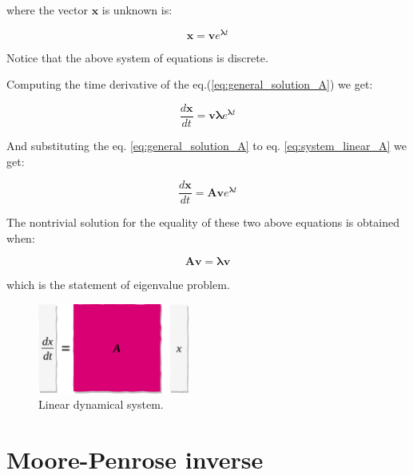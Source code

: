\documentclass[10pt,twocolumn]{article}
\begin{document}
where the vector $\mathbf{x}$ is unknown is:

\begin{equation} \label{eq:general_solution_A}
\mathbf{x} = \mathbf{v} e^{\bm{\lambda} t}
\end{equation}

Notice that the above system of equations is discrete.

Computing the time derivative of the eq.(\ref{eq:general_solution_A}) we get:

\begin{equation} \label{eq:sub1}
\frac{d \mathbf{x}}{dt} = \mathbf{v} \bm{\lambda} e^{\bm{\lambda} t}
\end{equation}

And substituting the eq. \ref{eq:general_solution_A} to eq. \ref{eq:system_linear_A} we get:

\begin{equation} \label{eq:sub2}
\frac{d \mathbf{x}}{dt} = \mathbf{A} \mathbf{v} e^{\bm{\lambda} t}
\end{equation}

The nontrivial solution for the equality of these two above equations is obtained when:

\begin{equation} \label{eq:eigval}
\mathbf{A} \mathbf{v} = \bm{\lambda} \mathbf{v} 
\end{equation}

which is the statement of eigenvalue problem.



\begin{figure}[H]
\centering\includegraphics[width=5cm]{lin-dyn.png}
\caption{Linear dynamical system.}
\label{fig:linear_system}
\end{figure}










\section{Moore-Penrose inverse} \label{app:B}
\end{document}
